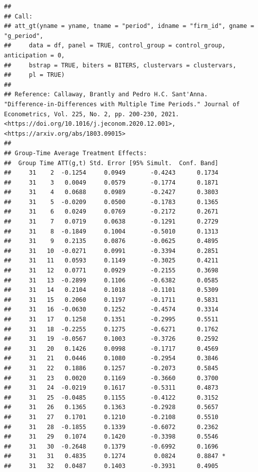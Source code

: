 \documentclass[
]{article}
\begin{document}
\begin{verbatim}
## 
## Call:
## att_gt(yname = yname, tname = "period", idname = "firm_id", gname = "g_period", 
##     data = df, panel = TRUE, control_group = control_group, anticipation = 0, 
##     bstrap = TRUE, biters = BITERS, clustervars = clustervars, 
##     pl = TRUE)
## 
## Reference: Callaway, Brantly and Pedro H.C. Sant'Anna.  "Difference-in-Differences with Multiple Time Periods." Journal of Econometrics, Vol. 225, No. 2, pp. 200-230, 2021. <https://doi.org/10.1016/j.jeconom.2020.12.001>, <https://arxiv.org/abs/1803.09015> 
## 
## Group-Time Average Treatment Effects:
##  Group Time ATT(g,t) Std. Error [95% Simult.  Conf. Band]  
##     31    2  -0.1254     0.0949       -0.4243      0.1734  
##     31    3   0.0049     0.0579       -0.1774      0.1871  
##     31    4   0.0688     0.0989       -0.2427      0.3803  
##     31    5  -0.0209     0.0500       -0.1783      0.1365  
##     31    6   0.0249     0.0769       -0.2172      0.2671  
##     31    7   0.0719     0.0638       -0.1291      0.2729  
##     31    8  -0.1849     0.1004       -0.5010      0.1313  
##     31    9   0.2135     0.0876       -0.0625      0.4895  
##     31   10  -0.0271     0.0991       -0.3394      0.2851  
##     31   11   0.0593     0.1149       -0.3025      0.4211  
##     31   12   0.0771     0.0929       -0.2155      0.3698  
##     31   13  -0.2899     0.1106       -0.6382      0.0585  
##     31   14   0.2104     0.1018       -0.1101      0.5309  
##     31   15   0.2060     0.1197       -0.1711      0.5831  
##     31   16  -0.0630     0.1252       -0.4574      0.3314  
##     31   17   0.1258     0.1351       -0.2995      0.5511  
##     31   18  -0.2255     0.1275       -0.6271      0.1762  
##     31   19  -0.0567     0.1003       -0.3726      0.2592  
##     31   20   0.1426     0.0998       -0.1717      0.4569  
##     31   21   0.0446     0.1080       -0.2954      0.3846  
##     31   22   0.1886     0.1257       -0.2073      0.5845  
##     31   23   0.0020     0.1169       -0.3660      0.3700  
##     31   24  -0.0219     0.1617       -0.5311      0.4873  
##     31   25  -0.0485     0.1155       -0.4122      0.3152  
##     31   26   0.1365     0.1363       -0.2928      0.5657  
##     31   27   0.1701     0.1210       -0.2108      0.5510  
##     31   28  -0.1855     0.1339       -0.6072      0.2362  
##     31   29   0.1074     0.1420       -0.3398      0.5546  
##     31   30  -0.2648     0.1379       -0.6992      0.1696  
##     31   31   0.4835     0.1274        0.0824      0.8847 *
##     31   32   0.0487     0.1403       -0.3931      0.4905  

\end{verbatim}
\end{document}
